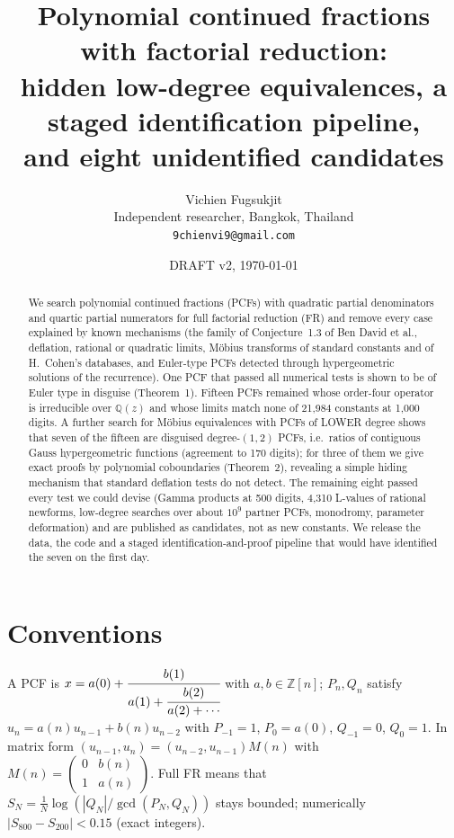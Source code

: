 \documentclass[11pt]{article}
\title{Polynomial continued fractions with factorial reduction:\\ hidden low-degree equivalences, a staged identification pipeline,\\ and eight unidentified candidates}
\author{Vichien Fugsukjit\\ Independent researcher, Bangkok, Thailand\\ \texttt{9chienvi9@gmail.com}}
\date{DRAFT v2, \today}
\begin{document}
\maketitle
\begin{abstract}
We search polynomial continued fractions (PCFs) with quadratic partial denominators and quartic partial numerators for full
factorial reduction (FR) and remove every case explained by known mechanisms (the family of Conjecture~1.3 of Ben David et al.,
deflation, rational or quadratic limits, M\"obius transforms of standard constants and of H.~Cohen's databases, and Euler-type
PCFs detected through hypergeometric solutions of the recurrence). One PCF that passed all numerical tests is shown to be of Euler
type in disguise (Theorem~1). Fifteen PCFs remained whose order-four operator is irreducible over $\mathbb Q(z)$ and whose limits
match none of 21{,}984 constants at 1{,}000 digits. A further search for M\"obius equivalences with PCFs of LOWER degree shows that
seven of the fifteen are disguised degree-$(1,2)$ PCFs, i.e.\ ratios of contiguous Gauss hypergeometric functions (agreement to
170 digits); for three of them we give exact proofs by polynomial coboundaries (Theorem~2), revealing a simple hiding mechanism
that standard deflation tests do not detect. The remaining eight passed every test we could devise (Gamma products at 500 digits,
4{,}310 L-values of rational newforms, low-degree searches over about $10^9$ partner PCFs, monodromy, parameter deformation)
and are published as candidates, not as new constants. We release the data, the code and a staged identification-and-proof
pipeline that would have identified the seven on the first day.
\end{abstract}

\section{Conventions}
A PCF is $x=a(0)+\cfrac{b(1)}{a(1)+\cfrac{b(2)}{a(2)+\cdots}}$ with $a,b\in\mathbb Z[n]$; $P_n,Q_n$ satisfy $u_n=a(n)u_{n-1}+b(n)u_{n-2}$
with $P_{-1}=1$, $P_0=a(0)$, $Q_{-1}=0$, $Q_0=1$. In matrix form $(u_{n-1},u_n)=(u_{n-2},u_{n-1})M(n)$ with $M(n)=\left(\begin{smallmatrix}0&b(n)\\1&a(n)\end{smallmatrix}\right)$.
Full FR means that $S_N=\frac1N\log(|Q_N|/\gcd(P_N,Q_N))$ stays bounded; numerically $|S_{800}-S_{200}|<0.15$ (exact integers).
\end{document}

